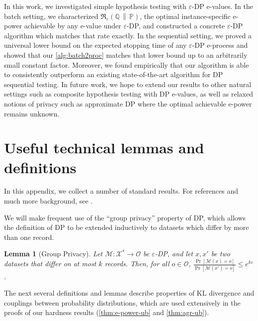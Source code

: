 \documentclass{article}
\newcommand{\Rdiv}[3][\eps]{%
  \mathfrak{R}_{#1}\!\left(#2\,\middle\|\,#3\right)%
}
\newcommand{\Null}{\mathbb{P}}
\newcommand{\Alt}{\mathbb{Q}}
\newcommand{\M}{\mathcal{M}}
\newcommand{\opt}{\Rdiv{\Alt}{\Null}}
\newcommand{\eps}{\varepsilon}
\newtheorem{lemma}{Lemma}[theorem]
\begin{document}
In this work, we investigated simple hypothesis testing with $\varepsilon$-DP e-values. 
In the batch setting, we characterized $\opt$, the optimal instance-specific e-power achievable by any e-value under $\varepsilon$-DP, and constructed a concrete $\varepsilon$-DP algorithm which matches that rate exactly. 
In the sequential setting, 
 we proved a universal lower bound on the expected stopping time of any $\varepsilon$-DP e-process and showed that our \cref{alg:batch2proc} matches that lower bound up to an arbitrarily small constant factor. 
Moreover, we found empirically that our algorithm is able to consistently outperform an existing state-of-the-art algorithm for DP sequential testing.
 In future work, we hope to extend our results to other natural settings such as composite hypothesis testing with DP e-values, as well as relaxed notions of privacy such as approximate DP where the optimal achievable e-power remains unknown.






\appendix


\section{Useful technical lemmas and definitions}\label{app:lemmas-and-defs}

In this appendix, we collect a number of standard results. 
For references and much more background, see \cite{upfal2005probability,ramdasHypothesisTestingEvalues,polyanskiy2025information}.

We will make frequent use of the ``group privacy'' property of DP, which allows the definition of DP to be extended inductively to datasets which differ by more than one record.
\begin{lemma}[Group Privacy]\label{lem:group-privacy}
    Let $\M: \mathcal{X}^* \to \mathcal{O}$ be $\varepsilon$-DP, and let $x, x'$ be two datasets that differ on at most $k$ records. Then, for all $o \in \mathcal{O}$, $\frac{\Pr[\M(x) = o]}{\Pr[\M(x') = o]} \leq e^{k\varepsilon}$.
\end{lemma}

The next several definitions and lemmas describe properties of KL divergence and couplings between probability distributions, which are used extensively in the proofs of our hardness results (\cref{thm:e-power-ub} and \cref{thm:agr-ub}).
\end{document}
